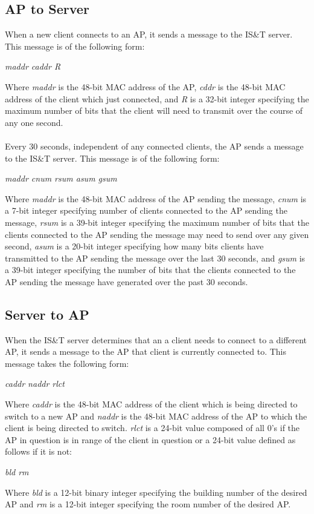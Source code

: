 \documentclass[10pt,journal,compsoc]{IEEEtran}
\begin{document}
		\subsection{AP to Server}
		When a new client connects to an AP, it sends a message to the IS\&T server. This message is of the following form:
		\begin{center}\textit{maddr \textbar caddr \textbar R}\end{center}
		Where \textit{maddr} is the 48-bit MAC address of the AP, \textit{cddr} is the 48-bit MAC address of the client which just connected, and \textit{R} is a 32-bit integer specifying the maximum number of bits that the client will need to transmit over the course of any one second.\\
		\\
		Every 30 seconds, independent of any connected clients, the AP sends a message to the IS\&T server. This message is of the following form:
		\begin{center}\textit{maddr \textbar cnum \textbar rsum \textbar asum \textbar gsum}\end{center}
		Where \textit{maddr} is the 48-bit MAC address of the AP sending the message, \textit{cnum} is a 7-bit integer specifying number of clients connected to the AP sending the message, \textit{rsum} is a 39-bit integer specifying the maximum number of bits that the clients connected to the AP sending the message may need to send over any given second, \textit{asum} is a 20-bit integer specifying how many bits clients have transmitted to the AP sending the message over the last 30 seconds, and \textit{gsum} is a 39-bit integer specifying the number of bits that the clients connected to the AP sending the message have generated over the past 30 seconds. 
		
		\subsection{Server to AP}
		When the IS\&T server determines that an a client needs to connect to a different AP, it sends a message to the AP that client is currently connected to. This message takes the following form:
		\begin{center}\textit{caddr \textbar naddr \textbar rlct }\end{center}
		Where \textit{caddr} is the 48-bit MAC address of the client which is being directed to switch to a new AP and \textit{naddr} is the 48-bit MAC address of the AP to which the client is being directed to switch. \textit{rlct} is a 24-bit value composed of all 0's if the AP in question is in range of the client in question or a 24-bit value defined as follows if it is not:
		\begin{center}\textit{bld \textbar rm}\end{center}
		Where \textit{bld} is a 12-bit binary integer specifying the building number of the desired AP and \textit{rm} is a 12-bit integer specifying the room number of the desired AP.
		
\end{document}
